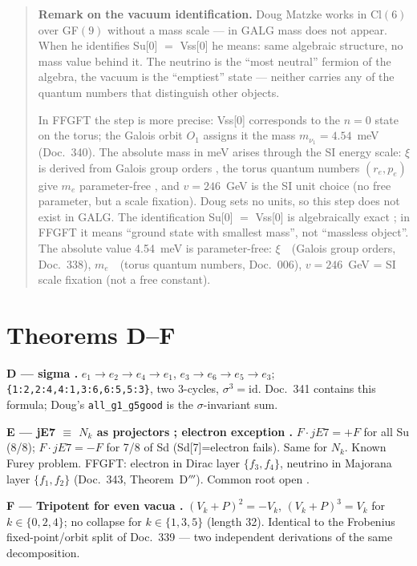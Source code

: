\begin{quote}\small
\textbf{Remark on the vacuum identification.}
Doug Matzke works in Cl$(6)$ over GF$(9)$ without a mass scale --- in GALG
mass does not appear. When he identifies Su[0] $=$ Vss[0] he means: same
algebraic structure, no mass value behind it. The neutrino is the
``most neutral'' fermion of the algebra, the vacuum is the ``emptiest'' state ---
neither carries any of the quantum numbers that distinguish other objects.

In FFGFT the step is more precise: Vss[0] corresponds to the $n=0$ state on
the torus; the Galois orbit $O_1$ assigns it the mass $m_{\nu_1}=4.54$~meV
(Doc.~340). The absolute mass in meV arises through the SI energy scale:
$\xi$ is derived from Galois group orders \KM,
the torus quantum numbers $(r_e, p_e)$ give $m_e$ parameter-free \KM,
and $v=246$~GeV is the SI unit choice (no free parameter,
but a scale fixation). Doug sets no units, so this step
does not exist in GALG. The identification Su[0] $=$ Vss[0]
is algebraically exact \BM; in FFGFT it means ``ground state with smallest
mass'', not ``massless object''.
The absolute value 4.54~meV is parameter-free: $\xi$~\KM\ (Galois group orders,
Doc.~338), $m_e$~\KM\ (torus quantum numbers, Doc.~006), $v=246$~GeV =
SI scale fixation (not a free constant).
\end{quote}


\section{Theorems D--F}

\textbf{D --- sigma \BM.} $e_1\to e_2\to e_4\to e_1$, $e_3\to e_6\to e_5\to e_3$;
\texttt{\{1:2,2:4,4:1,3:6,6:5,5:3\}}, two 3-cycles, $\sigma^3=\mathrm{id}$.
Doc.~341 contains this formula; Doug's \texttt{all\_g1\_g5good} is the $\sigma$-invariant sum.

\textbf{E --- jE7 $\equiv$ $N_k$ as projectors \BM; electron exception \SM.}
$F\cdot jE7 = +F$ for all Su (8/8); $F\cdot jE7 = -F$ for 7/8 of Sd (Sd[7]=electron fails).
Same for $N_k$. Known Furey problem. FFGFT: electron in Dirac layer $\{f_3,f_4\}$,
neutrino in Majorana layer $\{f_1,f_2\}$ (Doc.~343, Theorem~D$'''$). Common root open \SM.

\textbf{F --- Tripotent for even vacua \BM.}
$(V_k+P)^2=-V_k$, $(V_k+P)^3=V_k$ for $k\in\{0,2,4\}$;
no collapse for $k\in\{1,3,5\}$ (length 32). Identical to the Frobenius
fixed-point/orbit split of Doc.~339 --- two independent derivations of the same decomposition.



